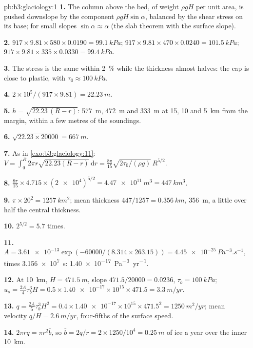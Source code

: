 \begin{solution}{pb:b3:glaciology:1}
\textbf{1.} The column above the bed, of weight $\rho gH$ per unit area, is
pushed downslope by the component $\rho gH\sin\alpha$, balanced by the
shear stress on its base; for small slopes $\sin\alpha \approx \alpha$ (the
slab theorem with the surface slope).

\textbf{2.} $917\times9.81\times580\times0.0190 = \qty{99.1}{kPa}$;
$917\times9.81\times470\times0.0240 = \qty{101.5}{kPa}$; $917\times9.81
\times335\times0.0330 = \qty{99.4}{kPa}$.

\textbf{3.} The stress is the same within \qty{2}{\percent} while the
thickness almost halves: the cap is close to plastic, with $\tau_0 \approx
\qty{100}{kPa}$.

\textbf{4.} $2\times10^5/(917\times9.81) = \qty{22.23}{m}$.

\textbf{5.} $h = \sqrt{22.23\,(R - r)}$: \qty{577}{m}, \qty{472}{m} and
\qty{333}{m} at 15, 10 and \qty{5}{km} from the margin, within a few metres
of the soundings.

\textbf{6.} $\sqrt{22.23\times20000} = \qty{667}{m}$.

\textbf{7.} As in \cref{exo:b3:glaciology:11}: $V = \int_0^R2\pi r
\sqrt{22.23(R - r)}\,\mathrm dr = \frac{8\pi}{15}\sqrt{2\tau_0/(\rho
g)}\,R^{5/2}$.

\textbf{8.} $\frac{8\pi}{15}\times4.715\times(\num{2e4})^{5/2} =
\qty{4.47e11}{m^3} = \qty{447}{km^3}$.

\textbf{9.} $\pi\times20^2 = \qty{1257}{km^2}$; mean thickness
$447/1257 = \qty{0.356}{km}$, \qty{356}{m}, a little over half the
central thickness.

\textbf{10.} $2^{5/2} = 5.7$ times.

\textbf{11.} $A = \num{3.61e-13}\exp(-60000/(8.314\times263.15)) =
\qty{4.45e-25}{Pa^{-3}.s^{-1}}$, times \qty{3.156e7}{s}:
\qty{1.40e-17}{Pa^{-3}.yr^{-1}}.

\textbf{12.} At \qty{10}{km}, $H = \qty{471.5}{m}$, slope $471.5/20000 =
\num{0.0236}$, $\tau_b = \qty{100}{kPa}$; $u_s = \tfrac{2A}{4}\tau_b^3H =
0.5\times\num{1.40e-17}\times10^{15}\times471.5 = \qty{3.3}{m/yr}$.

\textbf{13.} $q = \tfrac{2A}{5}\tau_b^3H^2 = 0.4\times\num{1.40e-17}
\times10^{15}\times471.5^2 = \qty{1250}{m^2/yr}$; mean velocity $q/H =
\qty{2.6}{m/yr}$, four-fifths of the surface speed.

\textbf{14.} $2\pi rq = \pi r^2\bar b$, so $\bar b = 2q/r = 2\times1250/10^4
= \qty{0.25}{m}$ of ice a year over the inner \qty{10}{km}.


\end{solution}
